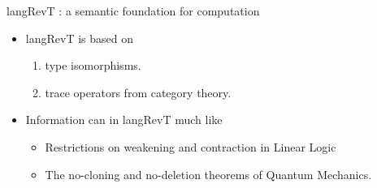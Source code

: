 \documentclass[svgnames,11pt]{beamer}
\newcommand{\red}[1]{{\color{red}{#1}}}
\begin{document}
\begin{frame}
  
    \begin{center}
    \end{center}


\end{frame}



\begin{frame}{ {{langRevT}} : a semantic foundation for computation}
  
\vfill
  \begin{itemize}

  \item {{langRevT}} is based on 

    \begin{enumerate}
    \item type isomorphisms.
    \item trace operators from category theory.
    \end{enumerate}

\pause
\vfill
  \item Information can \red{neither be created nor deleted} in {{langRevT}}
    much like

    \begin{itemize}
    \item Restrictions on weakening and contraction in Linear Logic 
    \item The no-cloning and no-deletion theorems of Quantum
      Mechanics.
    \end{itemize}

\vfill


      



 \end{itemize}



\end{frame}
\end{document}
